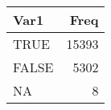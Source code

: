 
\begin{tabular}[t]{lr}
\toprule
Var1 & Freq\\
\midrule
TRUE & 15393\\
FALSE & 5302\\
NA & 8\\
\bottomrule
\end{tabular}